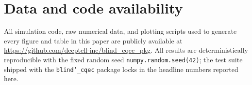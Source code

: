 \documentclass[a4paper,onecolumn]{quantumarticle}
\begin{document}
\section*{Data and code availability}
All simulation code, raw numerical data, and plotting scripts used to generate every figure and table in this paper are publicly available at \url{https://github.com/deeptell-inc/blind_cqec_pkg}. 
All results are deterministically reproducible with the fixed random seed \texttt{numpy.random.seed(42)}; the test suite shipped with the \texttt{blind\char`\_cqec} package locks in the headline numbers reported here.  
 
 
  
\end{document}

